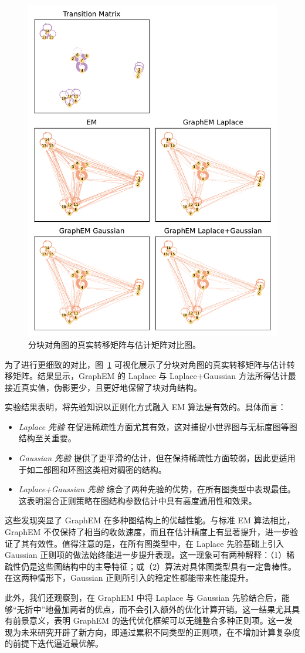 \begin{figure}[tb]
    \centering
    \includegraphics[width=0.75\linewidth]{fig/block diagonal/graphs_for_true_and_EM.pdf}
    \caption{分块对角图的真实转移矩阵与估计矩阵对比图。}
    \label{fig: graph comparison}
\end{figure}

为了进行更细致的对比，图~\ref{fig: graph comparison} 可视化展示了分块对角图的真实转移矩阵与估计转移矩阵。结果显示，GraphEM 的 Laplace 与 Laplace+Gaussian 方法所得估计最接近真实值，伪影更少，且更好地保留了块对角结构。

实验结果表明，将先验知识以正则化方式融入 EM 算法是有效的。具体而言：
\begin{itemize}
    \item \textit{Laplace 先验} 在促进稀疏性方面尤其有效，这对捕捉小世界图与无标度图等图结构至关重要。
    \item \textit{Gaussian 先验} 提供了更平滑的估计，但在保持稀疏性方面较弱，因此更适用于如二部图和环图这类相对稠密的结构。
    \item \textit{Laplace+Gaussian 先验} 综合了两种先验的优势，在所有图类型中表现最佳。这表明混合正则策略在图结构参数估计中具有高度通用性和效果。
\end{itemize}

这些发现突显了 GraphEM 在多种图结构上的优越性能。与标准 EM 算法相比，GraphEM 不仅保持了相当的收敛速度，而且在估计精度上有显著提升，进一步验证了其有效性。值得注意的是，在所有图类型中，在 Laplace 先验基础上引入 Gaussian 正则项的做法始终能进一步提升表现。这一现象可有两种解释：（1）稀疏性仍是这些图结构中的主导特征；或（2）算法对具体图类型具有一定鲁棒性。在这两种情形下，Gaussian 正则所引入的稳定性都能带来性能提升。

此外，我们还观察到，在 GraphEM 中将 Laplace 与 Gaussian 先验结合后，能够“无折中”地叠加两者的优点，而不会引入额外的优化计算开销。这一结果尤其具有前景意义，表明 GraphEM 的迭代优化框架可以无缝整合多种正则项。这一发现为未来研究开辟了新方向，即通过累积不同类型的正则项，在不增加计算复杂度的前提下迭代逼近最优解。
